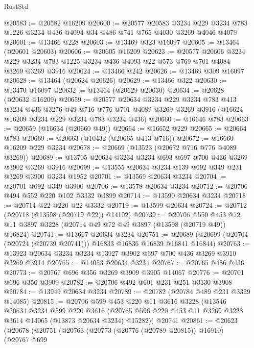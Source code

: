 \begin{lexlean}{RustStd}
\begin{coremodule}
@20583 := @20582 @16209
@20600 := @20577
    @20583
    @3234
    @229
    @3234
    @783
    @1226
    @3234
    @436
    @4094
    @34
    @486
    @741
    @765
    @4030
    @3269
    @4046
    @4079
@20601 := @13466 @228
@20603 := @13469 @323 @16097
@20605 := @13464 (@20601 @20603)
@20606 := @20605 @16209
@20623 := @20577
    @20606
    @3234
    @229
    @3234
    @783
    @1225
    @3234
    @436
    @4093
    @22
    @573
    @769
    @701
    @4084
    @3269
    @3269
    @3916
@20624 := @13466 @242
@20626 := @13469 @309 @16097
@20628 := @13464 (@20624 @20626)
@20629 := @13466 @322
@20630 := @13470 @16097
@20632 := @13464 (@20629 @20630)
@20634 := @20628 (@20632 @16209)
@20659 := @20577
    @20634
    @3234
    @229
    @3234
    @783
    @413
    @3234
    @436
    @3276
    @49
    @716
    @776
    @701
    @4089
    @3269
    @3269
    @3916
    (@16624 @16209 @3234 @229 @3234 @783 @3234 @436)
@20660 := @16646 @783
@20663 := @20659 (@16634 (@20660 @49))
@20664 := @16652 @229
@20665 := @20664 @783
@20669 := @20663 (@10432 (@20665 @413 @716))
@20672 := @16660 @16209 @229 @3234
@20678 := @20669 (@13523 (@20672 @716 @776 @4089 @3269))
@20689 := @13705 @20634 @3234 @3234 @693 @697 @700 @436 @3269 @3902 @3269 @3916
@20699 := @13555 @20634 @3234 @139 @692 @349 @231 @3269 @3900 @3234 @1952
@20701 := @13569 @20634 @3234
@20704 := @20701 @692 @349 @3900
@20706 := @13578 @20634 @3234
@20712 := @20706 @494 @552 @220 @102 @3332 @3899
@20714 := @13590 @20634 @3234
@20718 := @20714 @22 @220 @22 @3332
@20719 := @13599 @20634
@20724 := @20712 (@20718 (@13598 (@20719 @22)) @14102)
@20739 := @20706
    @550
    @453
    @72
    @11
    @3897
    @3228
    (@20714 @49 @72 @49 @3897 (@13598 (@20719 @49)) @16824)
@20741 := @13667 @20634 @3234
@20751 := @20689 (@20699 (@20704 (@20724 (@20739 @20741))) @16833 @16836 @16839 @16841 @16844)
@20763 := @13923 @20634 @3234 @3234 @13927 @3902 @697 @700 @436 @3269 @3910 @3269 @3914
@20765 := @14053 @20634 @3234
@20767 := @20765 @486 @436
@20773 := @20767 @696 @356 @3269 @3909 @3905 @14067
@20776 := @20701 @696 @356 @3909
@20782 := @20706 @492 @601 @231 @251 @3330 @3908
@20784 := @13949 @20634 @3234
@20789 := @20782 (@20784 @489 @231 @3329 @14085)
@20815 := @20706
    @599
    @453
    @220
    @11
    @3616
    @3228
    (@13546
      @20634
      @3234
      @599
      @220
      @3616
      (@20765 @596 @220 @453 @11 @3269 @3228 @3614 @14065 (@13873 @20634 @3234) @15282))
    @20741
@20861 := @20623
    (@20678
      (@20751
        (@20763
          (@20773 (@20776 (@20789 @20815)) @16910)
          (@20767
            @699

\end{coremodule}
\end{lexlean}
